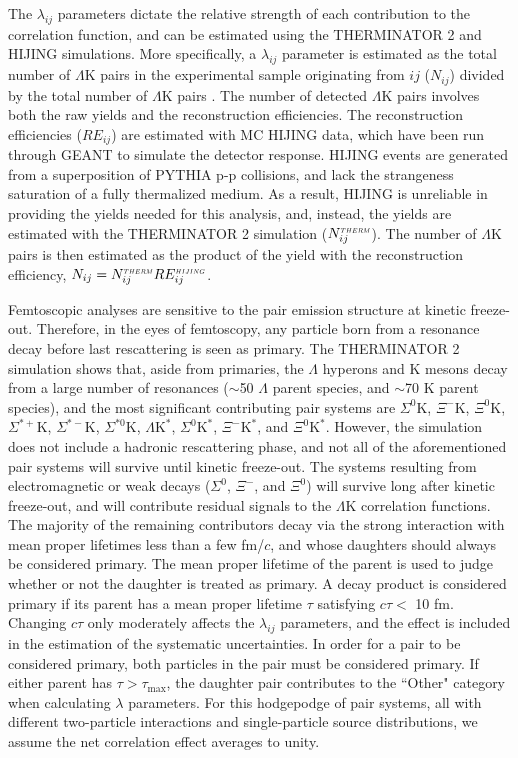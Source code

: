 \documentclass[ALICE,manyauthors]{cernphprep}
\newcommand{\Lam}{$\Lambda$\xspace}
\newcommand{\LamK}{$\Lambda$K\xspace}
\begin{document}
The $\lambda_{ij}$ parameters dictate the relative strength of each contribution to the correlation function, and can be estimated using the THERMINATOR 2 and HIJING simulations.
More specifically, a $\lambda_{ij}$ parameter is estimated as the total number of \LamK pairs in the experimental sample originating from $ij$ ($N_{ij}$) divided by the total number of \LamK pairs {}.
The number of detected \LamK pairs involves both the raw yields and the reconstruction efficiencies.
The reconstruction efficiencies ($RE_{ij}$) are estimated with MC HIJING data, which have been run through GEANT to simulate the detector response.
HIJING events are generated from a superposition of PYTHIA p-p collisions, and lack the strangeness saturation of a fully thermalized medium.
As a result, HIJING is unreliable in providing the yields needed for this analysis, and, instead, the yields are estimated with the THERMINATOR 2 simulation ($N_{ij}^{\scaleto{THERM}{3pt}}$).
The number of \LamK pairs is then estimated as the product of the yield with the reconstruction efficiency, $N_{ij} = N_{ij}^{\scaleto{THERM}{3pt}}RE_{ij}^{\scaleto{HIJING}{3pt}}$.



Femtoscopic analyses are sensitive to the pair emission structure at kinetic freeze-out.
Therefore, in the eyes of femtoscopy, any particle born from a resonance decay before last rescattering is seen as primary.
The THERMINATOR 2 simulation shows that, aside from primaries, the \Lam hyperons and K mesons decay from a large number of resonances ($\sim$50 \Lam parent species, and $\sim$70 K parent species), and the most significant contributing pair systems are $\Sigma^{0}$K, $\Xi^{-}$K, $\Xi^{0}$K, $\Sigma^{*+}$K, $\Sigma^{*-}$K, $\Sigma^{*0}$K, $\Lambda\mathrm{K}^{*}$, $\Sigma^{0}\mathrm{K}^{*}$, $\Xi^{-}\mathrm{K}^{*}$, and $\Xi^{0}\mathrm{K}^{*}$.
However, the simulation does not include a hadronic rescattering phase, and not all of the aforementioned pair systems will survive until kinetic freeze-out.
The systems resulting from electromagnetic or weak decays ($\Sigma^{0}$, $\Xi^{-}$, and $\Xi^{0}$) will survive long after kinetic freeze-out, and will contribute residual signals to the \LamK correlation functions.
The majority of the remaining contributors decay via the strong interaction with mean proper lifetimes less than a few fm/$c$, and whose daughters should always be considered primary.
The mean proper lifetime of the parent is used to judge whether or not the daughter is treated as primary.
A decay product is considered primary if its parent has a mean proper lifetime $\tau$ satisfying $c\tau <$ 10 fm.
Changing $c\tau$ only moderately affects the $\lambda_{ij}$ parameters, and the effect is included in the estimation of the systematic uncertainties.
In order for a pair to be considered primary, both particles in the pair must be considered primary. 
If either parent has $\tau > \tau_{\mathrm{max}}$, the daughter pair contributes to the ``Other" category when calculating $\lambda$ parameters.
For this hodgepodge of pair systems, all with different two-particle interactions and single-particle source distributions, we assume the net correlation effect averages to unity.
\end{document}
